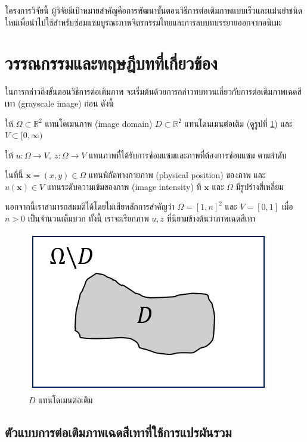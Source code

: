\documentclass[hidelinks,a4paper]{article}
\numberwithin{equation}{section}							%
\begin{document}
{		 \hspace{1cm} โครงการวิจัยนี้ ผู้วิจัยมีเป้าหมายสำคัญคือการพัฒนาขั้นตอนวิธีการต่อเติมภาพแบบเร็วและแม่นยำชนิดใหม่เพื่อนำไปใช้สำหรับซ่อมแซมบูรณะภาพจิตรกรรมไทยและการลบบทบรรยายออกจากอนิเมะ

		 
		 
		 
\section{วรรณกรรมและทฤษฎีบทที่เกี่ยวข้อง}
 

\hspace{1cm} ในการกล่าวถึงขั้นตอนวิธีการต่อเติมภาพ จะเริ่มต้นด้วยการกล่าวทบทวนเกี่ยวกับการต่อเติมภาพเฉดสีเทา (grayscale image) ก่อน ดังนี้

\hspace{1cm} ให้ $\Omega \subset \mathbb{R}^2$ แทนโดเมนภาพ (image domain) $D \subset \mathbb{R}^2$ แทนโดนเมนต่อเติม (ดูรูปที่ \ref{fig4}) และ $V \subset [0,\infty)$ 

\hspace{1cm} ให้ $ u: \Omega \rightarrow V,\ z: \Omega \rightarrow V$ แทนภาพที่ได้รับการซ่อมแซมและภาพที่ต้องการซ่อมแซม ตามลำดับ

\hspace{1cm} ในที่นี้ $ \mathbf{x} = (x,y) \in \Omega $ แทนพิกัดทางกายภาพ (physical position) ของภาพ และ $ u(\mathbf{x}) \in V $ แทนระดับความเข้มของภาพ (image intensity) ที่ $ \mathbf{x} $ และ $ \Omega $ มีรูปร่างสี่เหลี่ยม 

\hspace{1cm} นอกจากนี้เราสามารถสมมติได้โดยไม่เสียหลักการสำคัญว่า $ \Omega = [1,n]^2 $ และ $ V = [0,1] $ เมื่อ $n>0$ เป็นจำนวนเต็มบวก ทั้งนี้ เราจะเรียกภาพ $u,z$ ที่นิยามข้างต้นว่าภาพเฉดสีเทา
\begin{figure}[H]
	\centering
	\includegraphics[width=0.4\linewidth]{images/sample-domain.png}
	\caption{$D$ แทนโดเมนต่อเติม}
	\label{fig4}
\end{figure}

\subsection{ตัวแบบการต่อเติมภาพเฉดสีเทาที่ใช้การแปรผันรวม}

}
\end{document}
